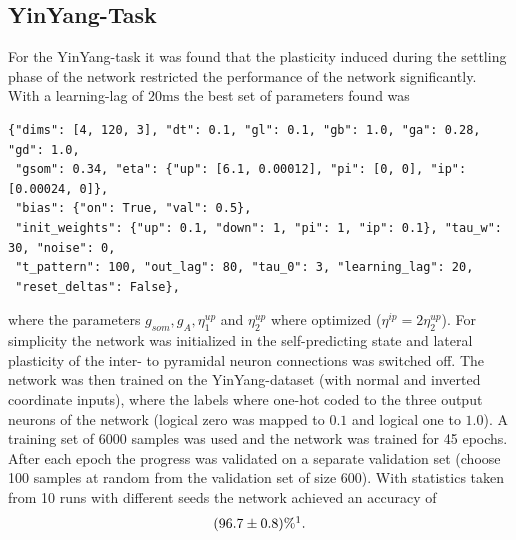 \documentclass[12pt,a4paper]{article}
\begin{document}
\subsection{YinYang-Task}
For the YinYang-task it was found that the plasticity induced during the settling phase of the network restricted the performance of the network significantly. With a learning-lag of $20\text{ms}$ the best set of parameters found was 
\begin{verbatim}
{"dims": [4, 120, 3], "dt": 0.1, "gl": 0.1, "gb": 1.0, "ga": 0.28, "gd": 1.0,
 "gsom": 0.34, "eta": {"up": [6.1, 0.00012], "pi": [0, 0], "ip": [0.00024, 0]},
 "bias": {"on": True, "val": 0.5},
 "init_weights": {"up": 0.1, "down": 1, "pi": 1, "ip": 0.1}, "tau_w": 30, "noise": 0,
 "t_pattern": 100, "out_lag": 80, "tau_0": 3, "learning_lag": 20,
 "reset_deltas": False},
\end{verbatim}
where the parameters $g_{som}, g_A, \eta^{up}_1$ and $\eta^{up}_{2}$ where optimized ($\eta^{ip} = 2\eta^{up}_2$). For simplicity the network was initialized in the self-predicting state and lateral plasticity of the inter- to pyramidal neuron connections was switched off. The network was then trained on the YinYang-dataset (with normal and inverted coordinate inputs), where the labels where one-hot coded to the three output neurons of the network (logical zero was mapped to $0.1$ and logical one to $1.0$). A training set of 6000 samples was used and the network was trained for 45 epochs. After each epoch the progress was validated on a separate validation set (choose 100 samples at random from the validation set of size 600). With statistics taken from 10 runs with different seeds the network achieved an accuracy of
\begin{align*}
(96.7 \pm 0.8)\% \protect\footnotemark.
\end{align*}
\end{document}
